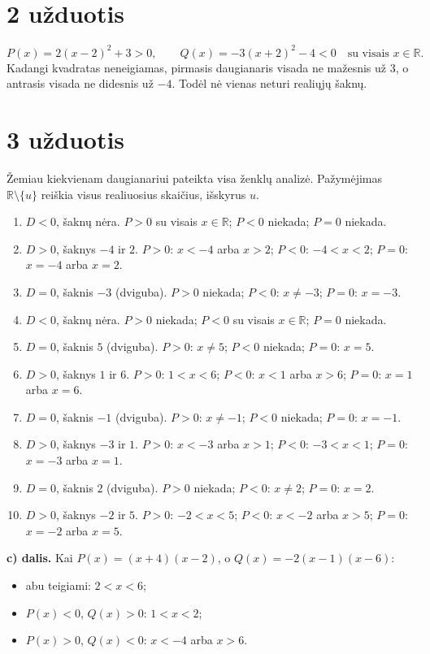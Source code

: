 \documentclass[11pt,a4paper]{article}
\newcommand{\R}{\mathbb{R}}
\begin{document}
\section*{2 užduotis}
\[
P(x)=2(x-2)^2+3>0,\qquad Q(x)=-3(x+2)^2-4<0
\quad\text{su visais }x\in\R.
\]
Kadangi kvadratas neneigiamas, pirmasis daugianaris visada ne mažesnis
 už $3$, o antrasis visada ne didesnis už $-4$.
 Todėl nė vienas neturi realiųjų šaknų.

\section*{3 užduotis}
Žemiau kiekvienam daugianariui pateikta visa ženklų analizė.
 Pažymėjimas $\R\setminus\{u\}$ reiškia visus realiuosius skaičius,
 išskyrus $u$.
\begin{enumerate}[label=\textbf{\arabic*.},leftmargin=0.85cm,itemsep=.6em]
\item $D<0$, šaknų nėra. $P>0$ su visais $x\in\R$; $P<0$ niekada;
 $P=0$ niekada.
\item $D>0$, šaknys $-4$ ir $2$.
 $P>0$: $x<-4$ arba $x>2$;
 $P<0$: $-4<x<2$;
 $P=0$: $x=-4$ arba $x=2$.
\item $D=0$, šaknis $-3$ (dviguba).
 $P>0$ niekada; $P<0$: $x\neq -3$; $P=0$: $x=-3$.
\item $D<0$, šaknų nėra. $P>0$ niekada;
 $P<0$ su visais $x\in\R$; $P=0$ niekada.
\item $D=0$, šaknis $5$ (dviguba).
 $P>0$: $x\neq5$; $P<0$ niekada; $P=0$: $x=5$.
\item $D>0$, šaknys $1$ ir $6$.
 $P>0$: $1<x<6$;
 $P<0$: $x<1$ arba $x>6$;
 $P=0$: $x=1$ arba $x=6$.
\item $D=0$, šaknis $-1$ (dviguba).
 $P>0$: $x\neq -1$; $P<0$ niekada; $P=0$: $x=-1$.
\item $D>0$, šaknys $-3$ ir $1$.
 $P>0$: $x<-3$ arba $x>1$;
 $P<0$: $-3<x<1$;
 $P=0$: $x=-3$ arba $x=1$.
\item $D=0$, šaknis $2$ (dviguba).
 $P>0$ niekada; $P<0$: $x\neq2$; $P=0$: $x=2$.
\item $D>0$, šaknys $-2$ ir $5$.
 $P>0$: $-2<x<5$;
 $P<0$: $x<-2$ arba $x>5$;
 $P=0$: $x=-2$ arba $x=5$.
\end{enumerate}
\textbf{c) dalis.} Kai $P(x)=(x+4)(x-2)$, o
$Q(x)=-2(x-1)(x-6)$:
\begin{itemize}
\item abu teigiami: $2<x<6$;
\item $P(x)<0$, $Q(x)>0$: $1<x<2$;
\item $P(x)>0$, $Q(x)<0$: $x<-4$ arba $x>6$.
\end{itemize}
\end{document}
